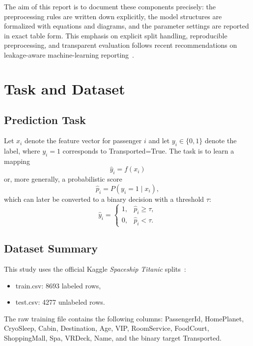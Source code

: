 \documentclass[conference]{IEEEtran}
\renewcommand{\texttt}[1]{\textnormal{#1}}
\begin{document}
The aim of this report is to document these components precisely: the preprocessing rules are written down explicitly, the model structures are formalized with equations and diagrams, and the parameter settings are reported in exact table form. This emphasis on explicit split handling, reproducible preprocessing, and transparent evaluation follows recent recommendations on leakage-aware machine-learning reporting~\cite{kapoor2023leakage,kapoor2024reforms}.

\section{Task and Dataset}
\subsection{Prediction Task}
Let $x_i$ denote the feature vector for passenger $i$ and let $y_i \in \{0,1\}$ denote the label, where $y_i=1$ corresponds to \texttt{Transported=True}. The task is to learn a mapping
\begin{equation}
\hat{y}_i = f(x_i)
\end{equation}
or, more generally, a probabilistic score
\begin{equation}
\hat{p}_i = P(y_i = 1 \mid x_i),
\end{equation}
which can later be converted to a binary decision with a threshold $\tau$:
\begin{equation}
\hat{y}_i =
\begin{cases}
1, & \hat{p}_i \ge \tau,\\
0, & \hat{p}_i < \tau.
\end{cases}
\end{equation}

\subsection{Dataset Summary}
This study uses the official Kaggle \textit{Spaceship Titanic} splits~\cite{kaggle_spaceship_titanic}:
\begin{itemize}
\item \texttt{train.csv}: 8693 labeled rows,
\item \texttt{test.csv}: 4277 unlabeled rows.
\end{itemize}

The raw training file contains the following columns:
\texttt{PassengerId}, \texttt{HomePlanet}, \texttt{CryoSleep}, \texttt{Cabin}, \texttt{Destination}, \texttt{Age}, \texttt{VIP}, \texttt{RoomService}, \texttt{FoodCourt}, \texttt{ShoppingMall}, \texttt{Spa}, \texttt{VRDeck}, \texttt{Name}, and the binary target \texttt{Transported}.
\end{document}
